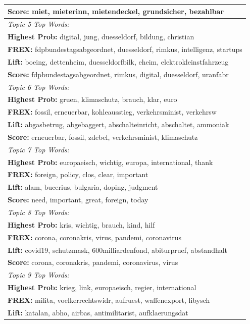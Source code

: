 \begin{center}
\begin{longtable}{|l|}
 	 \textbf{Score:} miet, mieterinn, mietendeckel, grundsicher, bezahlbar \\
\hline
\textit{Topic 5 Top Words:}\\
 	 \textbf{Highest Prob:} digital, jung, duesseldorf, bildung, christian \\
 	 \textbf{FREX:} fdpbundestagsabgeordnet, duesseldorf, rimkus, intelligenz, startups \\
 	 \textbf{Lift:} boeing, dettenheim, duesseldorfbilk, eheim, elektrokleinstfahrzeug \\
 	 \textbf{Score:} fdpbundestagsabgeordnet, rimkus, digital, duesseldorf, uranfabr \\
\hline
\textit{Topic 6 Top Words:}\\
 	 \textbf{Highest Prob:} gruen, klimaschutz, brauch, klar, euro \\
 	 \textbf{FREX:} fossil, erneuerbar, kohleausstieg, verkehrsminist, verkehrsw \\
 	 \textbf{Lift:} abgasbetrug, abgebaggert, abschalteinricht, abschaltet, ammoniak \\
 	 \textbf{Score:} erneuerbar, fossil, zdebel, verkehrsminist, klimaschutz \\
\hline
\textit{Topic 7 Top Words:}\\
 	 \textbf{Highest Prob:} europaeisch, wichtig, europa, international, thank \\
 	 \textbf{FREX:} foreign, policy, clos, clear, important \\
 	 \textbf{Lift:} alam, bucerius, bulgaria, doping, judgment \\
 	 \textbf{Score:} need, important, great, foreign, today \\
\hline
\textit{Topic 8 Top Words:}\\
 	 \textbf{Highest Prob:} kris, wichtig, brauch, kind, hilf \\
 	 \textbf{FREX:} corona, coronakris, virus, pandemi, coronavirus \\
 	 \textbf{Lift:} covid19, schutzmask, 600milliardenfond, abiturpruef, abstandhalt \\
 	 \textbf{Score:} corona, coronakris, pandemi, coronavirus, virus \\
\hline
\textit{Topic 9 Top Words:}\\
 	 \textbf{Highest Prob:} krieg, link, europaeisch, regier, international \\
 	 \textbf{FREX:} milita, voelkerrechtswidr, aufruest, waffenexport, libysch \\
 	 \textbf{Lift:} katalan, abho, airbas, antimilitarist, aufklaerungsdat \\

\end{longtable}
\end{center}
